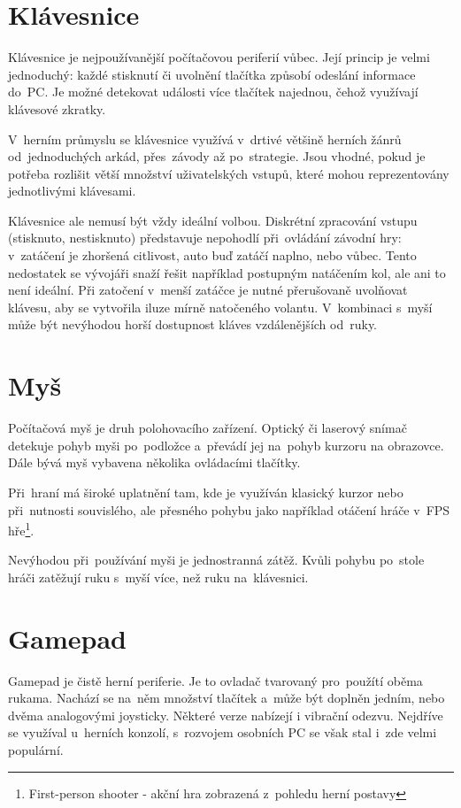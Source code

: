 \documentclass[thesis=B,czech,hidelinks]{FITthesis}[2012/06/26] %
\begin{document}
\section{Klávesnice}

Klávesnice je nejpoužívanější počítačovou periferií vůbec. Její princip je velmi jednoduchý: každé stisknutí či uvolnění tlačítka způsobí odeslání informace do~PC. Je možné detekovat události více tlačítek najednou, čehož využívají klávesové zkratky.

V~herním průmyslu se klávesnice využívá v~drtivé většině herních žánrů od~jednoduchých arkád, přes~závody až po~strategie. Jsou vhodné, pokud je potřeba rozlišit větší množství uživatelských vstupů, které mohou reprezentovány jednotlivými klávesami.

Klávesnice ale nemusí být vždy ideální volbou. Diskrétní zpracování vstupu (stisknuto, nestisknuto) představuje nepohodlí při~ovládání závodní hry: v~zatáčení je zhoršená citlivost, auto buď zatáčí naplno, nebo vůbec. Tento nedostatek se vývojáři snaží řešit například postupným natáčením kol, ale ani to není ideální. Při zatočení v~menší zatáčce je nutné přerušovaně uvolňovat klávesu, aby se vytvořila iluze mírně natočeného volantu. V~kombinaci s~myší může být nevýhodou horší dostupnost kláves vzdálenějších od~ruky.

\section{Myš}

Počítačová myš je druh polohovacího zařízení. Optický či laserový snímač detekuje pohyb myši po~podložce a~převádí jej na~pohyb kurzoru na obrazovce. Dále bývá myš vybavena několika ovládacími tlačítky.

Při~hraní má široké uplatnění tam, kde je využíván klasický kurzor nebo při~nutnosti souvislého, ale přesného pohybu jako například otáčení hráče v~FPS hře\footnote{First-person shooter - akční hra zobrazená z~pohledu herní postavy}.

Nevýhodou při~používání myši je jednostranná zátěž. Kvůli pohybu po~stole hráči zatěžují ruku s~myší více, než ruku na~klávesnici.

\section{Gamepad}

Gamepad je čistě herní periferie. Je to ovladač tvarovaný pro~použítí oběma rukama. Nachází se na~něm množství tlačítek a~může být doplněn jedním, nebo dvěma analogovými joysticky. Některé verze nabízejí i vibrační odezvu. Nejdříve se využíval u~herních konzolí, s~rozvojem osobních PC se však stal i~zde velmi populární.
\end{document}
